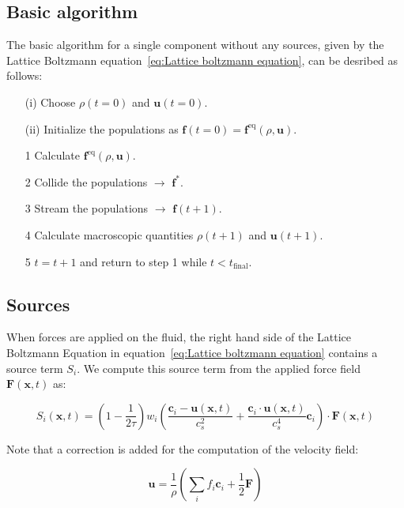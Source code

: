 \subsection{Basic algorithm}\label{subsec:Basic algorithm}
The basic algorithm for a single component without any sources, given by the Lattice Boltzmann equation~\ref{eq:Lattice boltzmann equation}, can be desribed as follows:

\begin{itemize}\label{it:Basic algorithm}
    \item[(i)] Choose $\rho(t=0)$ and $\bm{u}(t=0)$.
    \item[(ii)] Initialize the populations as $\bm{f}(t=0) = \bm{f}^{\text{eq}}(\rho, \bm{u})$. 
    \item[1] Calculate $\bm{f}^{\text{eq}}(\rho, \bm{u})$.
    \item[2] Collide the populations $\rightarrow$ $\bm{f}^*$.
    \item[3] Stream the populations $\rightarrow$ $\bm{f}(t + 1)$.
    \item[4] Calculate macroscopic quantities $\rho(t + 1)$ and $\bm{u}(t + 1)$.
    \item[5] $t = t + 1$ and return to step 1 while $t < t_{\text{final}}$.
\end{itemize}

\subsection{Sources}
When forces are applied on the fluid, the right hand side of the Lattice Boltzmann Equation in equation~\ref{eq:Lattice boltzmann equation} contains a source term $S_i$. We compute this source term from the applied force field $\bm{F}(\bm{x}, t)$ as:

\begin{equation}\label{eq:Source term}
    S_i(\bm{x}, t) = \left(1 - \frac{1}{2\tau}\right) w_i \left(\frac{\bm{c}_i - \bm{u}(\bm{x}, t)}{c_s^2} + \frac{\bm{c}_i \cdot \bm{u}(\bm{x}, t)}{c_s^4}\bm{c}_i\right) \cdot \bm{F}(\bm{x}, t)
\end{equation}

Note that a correction is added for the computation of the velocity field:

\begin{equation}\label{eq:Velocity with correction}
    \bm{u} = \frac{1}{\rho} \left(\sum_i f_i \bm{c}_i + \frac{1}{2}\bm{F}\right)
\end{equation}

